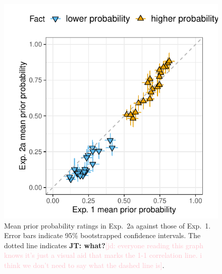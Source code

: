 \documentclass[11pt,fleqn]{article}
\newcommand{\jd}[1]{\textcolor{Pink}{[jd: #1]}}
\newcommand{\jt}[1]{\textbf{\color{blue}JT: #1}}
\newcommand{\6}{\mbox{$[\hspace*{-.6mm}[$}}
\newcommand{\9}{\mbox{$]\hspace*{-.6mm}]$}}
\begin{document}
\begin{figure}[h!]
\centering

\includegraphics[width=.4\paperwidth]{../../results/1-prior/graphs/prior-probability-comparison-exp1-exp2}

\caption{Mean prior probability ratings in Exp.~2a against those of Exp.~1. Error bars indicate 95\% bootstrapped confidence intervals. The dotted line indicates \jt{what?}\jd{everyone reading this graph knows it's just a visual aid that marks the 1-1 correlation line. i think we don't need to say what the dashed line is}.}
\label{f-prior-comparison}
\end{figure}
\end{document}
